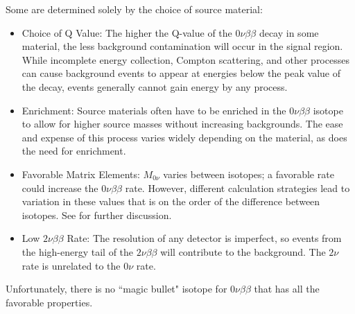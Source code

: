 Some are determined solely by the choice of source material:
\begin{itemize}
\item Choice of Q Value: The higher the Q-value of the $0\nu\beta\beta$ decay in some material, the less background contamination will occur in the signal region. While incomplete energy collection, Compton scattering, and other processes can cause background events to appear at energies below the peak value of the decay, events generally cannot gain energy by any process. 
\item Enrichment: Source materials often have to be enriched in the $0\nu\beta\beta$ isotope to allow for higher source masses without increasing backgrounds. The ease and expense of this process varies widely depending on the material, as does the need for enrichment.
\item Favorable Matrix Elements: $M_{0\nu}$ varies between isotopes; a favorable rate could increase the $0\nu\beta\beta$ rate. However, different calculation strategies lead to variation in these values that is on the order of the difference between isotopes. See \cite{Simkovic2009} for further discussion. 
\item Low $2\nu\beta\beta$ Rate: The resolution of any detector is imperfect, so events from the high-energy tail of the $2\nu\beta\beta$ will contribute to the background. The $2\nu$ rate is unrelated to the $0\nu$ rate.
\end{itemize} 
Unfortunately, there is no ``magic bullet" isotope for $0\nu\beta\beta$ that has all the favorable properties. 

